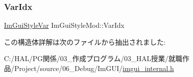 \mbox{\label{struct_im_gui_style_mod_ab23c55941dbd0e156ce640a8fecb2feb}} 
\subsubsection{\texorpdfstring{Var\+Idx}{VarIdx}}
{\footnotesize\ttfamily \mbox{\hyperlink{imgui_8h_ac919acabce24faae590e295b424874ca}{Im\+Gui\+Style\+Var}} Im\+Gui\+Style\+Mod\+::\+Var\+Idx}



この構造体詳解は次のファイルから抽出されました\+:\begin{DoxyCompactItemize}
\item 
C\+:/\+H\+A\+L/\+P\+G関係/03\+\_\+作成プログラム/03\+\_\+\+H\+A\+L授業/就職作品/\+Project/source/06\+\_\+\+Debug/\+Im\+G\+U\+I/\mbox{\hyperlink{imgui__internal_8h}{imgui\+\_\+internal.\+h}}\end{DoxyCompactItemize}
